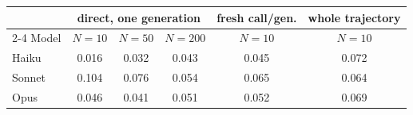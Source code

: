 \begin{tabular}{lccccc}
\toprule
 & \multicolumn{3}{c}{direct, one generation} & fresh call/gen. & whole trajectory \\
\cmidrule(lr){2-4}
Model & $N=10$ & $N=50$ & $N=200$ & $N=10$ & $N=10$ \\
\midrule
Haiku & 0.016 & 0.032 & 0.043 & 0.045 & 0.072 \\
Sonnet & 0.104 & 0.076 & 0.054 & 0.065 & 0.064 \\
Opus & 0.046 & 0.041 & 0.051 & 0.052 & 0.069 \\
\bottomrule
\end{tabular}
